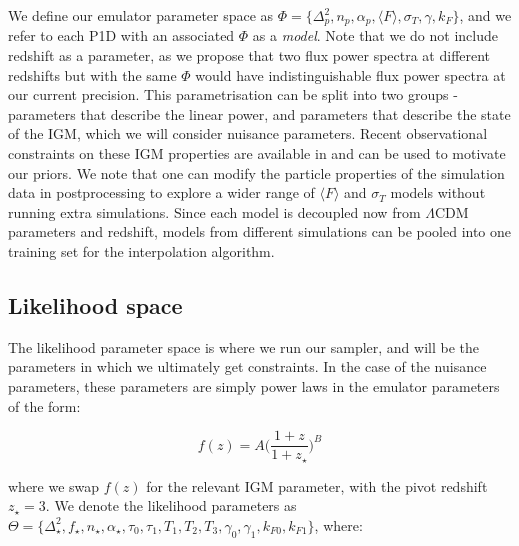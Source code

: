 \documentclass[]{article}
\begin{document}
\noindent We define our emulator parameter space as $\Phi=\{ \Delta^2_p,n_p,\alpha_p,\langle F\rangle,\sigma_T,\gamma,k_F \}$, and we refer to each P1D with an associated 
$\Phi$ as a \textit{model}. Note that we do not include redshift as a parameter, as we 
propose that two flux power spectra at different redshifts but with the same $\Phi$ would 
have indistinguishable flux power spectra at our current precision. This parametrisation 
can be split into two groups - parameters that describe the linear power, and parameters 
that describe the state of the IGM, which we will consider nuisance parameters. Recent 
observational constraints on these IGM properties are available in \cite{Walther2018} and 
can be used to motivate our priors. We note that one can modify the particle properties 
of the simulation data in postprocessing to explore a wider range of $\langle F\rangle$ 
and $\sigma_T$ models without running extra simulations. Since each model is decoupled 
now from $\Lambda$CDM parameters and redshift, models from different simulations can be 
pooled into one training set for the interpolation algorithm.

\subsection{Likelihood space}
The likelihood parameter space is where we run our sampler, and will be the parameters in 
which we ultimately get constraints. In the case of the nuisance parameters, these
parameters are simply power laws in the emulator parameters of the form:

\begin{equation}
    f(z)=A\bigg(\frac{1+z}{1+z_\star}\bigg)^B
\end{equation}

\noindent where we swap $f(z)$ for the relevant IGM parameter, with the pivot 
redshift $z_\star=3$. We denote the likelihood parameters as $\Theta=\{ \Delta^2_\star, f_\star, n_\star, \alpha_\star, \tau_0, \tau_1, T_1, T_2, T_3, \gamma_0, \gamma_1, k_{F0}, k_{F1} \}$, where:
\end{document}
